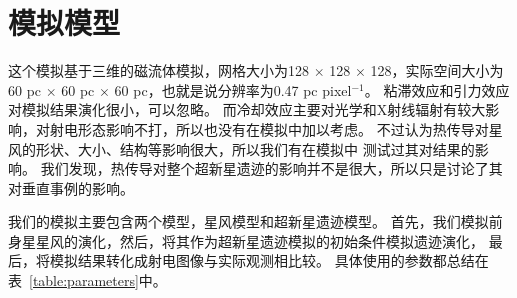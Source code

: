 \section{模拟模型}
\label{SWmod}
这个模拟基于三维的磁流体模拟，网格大小为128 $\times$ 128 $\times$ 128，实际空间大小为
60 pc $\times$ 60 pc $\times$ 60 pc，也就是说分辨率为0.47 pc pixel$^{-1}$。
粘滞效应和引力效应对模拟结果演化很小，可以忽略。
而冷却效应主要对光学和X射线辐射有较大影响，对射电形态影响不打，所以也没有在模拟中加以考虑。
不过\citep{Meyer2014}认为热传导对星风的形状、大小、结构等影响很大，所以我们有在模拟中
测试过其对结果的影响。
我们发现，热传导对整个超新星遗迹的影响并不是很大，所以只是讨论了其对垂直事例的影响。

我们的模拟主要包含两个模型，星风模型和超新星遗迹模型。
首先，我们模拟前身星星风的演化，然后，将其作为超新星遗迹模拟的初始条件模拟遗迹演化，
最后，将模拟结果转化成射电图像与实际观测相比较。
具体使用的参数都总结在表~\ref{table:parameters}中。

